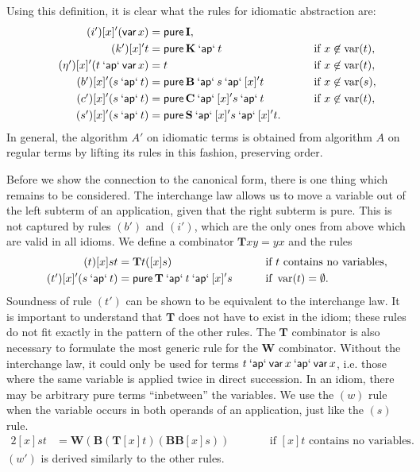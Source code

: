 Using this definition, it is clear what the rules for idiomatic abstraction
are:
\begin{alignat}{2}
	\tag{$i'$} [x]'(\operatorname{\mathsf{var}} x) &= \operatorname{\mathsf{pure}} \mathbf{I}, && \\
	\tag{$k'$} [x]'t &= \operatorname{\mathsf{pure}} \mathbf{K} \mathbin{\mathsf{`ap`}} t &&\qquad\text{if } x \not\in \operatorname{var}(t), \\
	\tag{$\eta'$} [x]'(t \mathbin{\mathsf{`ap`}} \operatorname{\mathsf{var}} x) &= t &&\qquad\text{if } x \not\in\operatorname{var}(t), \\
	\tag{$b'$} [x]'(s \mathbin{\mathsf{`ap`}} t) &= \operatorname{\mathsf{pure}} \mathbf{B} \mathbin{\mathsf{`ap`}} s \mathbin{\mathsf{`ap`}} [x]'t &&\qquad\text{if } x \not\in \operatorname{var}(s), \\
	\tag{$c'$} [x]'(s \mathbin{\mathsf{`ap`}} t) &= \operatorname{\mathsf{pure}} \mathbf{C} \mathbin{\mathsf{`ap`}} [x]'s \mathbin{\mathsf{`ap`}} t &&\qquad\text{if } x \not\in \operatorname{var}(t), \\
	\tag{$s'$} [x]'(s \mathbin{\mathsf{`ap`}} t) &= \operatorname{\mathsf{pure}} \mathbf{S} \mathbin{\mathsf{`ap`}} [x]'s \mathbin{\mathsf{`ap`}} [x]'t. &&
\end{alignat}
In general, the algorithm $A'$ on idiomatic terms is obtained from algorithm
$A$ on regular terms by lifting its rules in this fashion, preserving order.

Before we show the connection to the canonical form, there is one thing which
remains to be considered.
The interchange law allows us to move a variable out of the left subterm of
an application, given that the right subterm is pure.
This is not captured by rules $(b')$ and $(i')$, which are the only ones from
above which are valid in all idioms.
We define a combinator $\mathbf{T}xy = yx$ and the rules
\begin{alignat}{2}
	\tag{$t$} [x]st &= \mathbf{T}t([x]s) &&\qquad\text{if $t$ contains no variables}, \\
	\tag{$t'$} [x]'(s \mathbin{\mathsf{`ap`}} t) &= \operatorname{\mathsf{pure}} \mathbf{T} \mathbin{\mathsf{`ap`}} t \mathbin{\mathsf{`ap`}} [x]'s
		&&\qquad\text{if } \operatorname{var}(t) = \emptyset.
\end{alignat}
Soundness of rule $(t')$ can be shown to be equivalent to the interchange law.
It is important to understand that $\mathbf{T}$ does not have to exist in the
idiom; these rules do not fit exactly in the pattern of the other rules.
The $\mathbf{T}$ combinator is also necessary to formulate the most generic
rule for the $\mathbf{W}$ combinator.
Without the interchange law, it could only be used for terms
$t \mathbin{\mathsf{`ap`}} \operatorname{\mathsf{var}} x \mathbin{\mathsf{`ap`}} \operatorname{\mathsf{var}} x$, i.e. those where the same variable is applied
twice in direct succession.
In an idiom, there may be arbitrary pure terms ``inbetween'' the variables.
We use the $(w)$ rule when the variable occurs in both operands of an application,
just like the $(s)$ rule.
\begin{alignat}{2}
	\tag{$w$} [x]st &= \mathbf{W}(\mathbf{B}(\mathbf{T}[x]t)(\mathbf{B}\mathbf{B}[x]s))
		&&\qquad\text{if $[x]t$ contains no variables}.
\end{alignat}
$(w')$ is derived similarly to the other rules.

